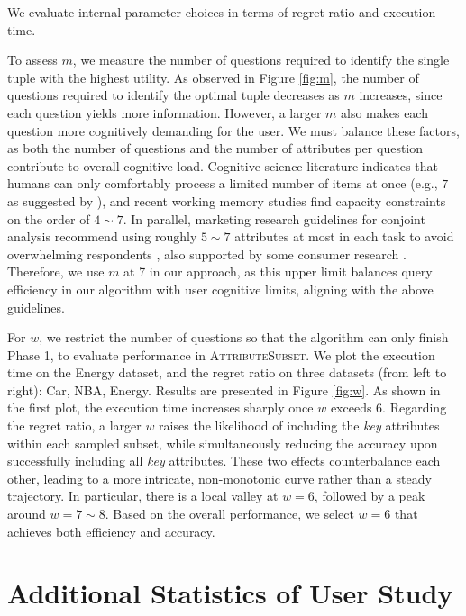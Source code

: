 \documentclass[conference]{IEEEtran}
\theoremstyle{definition}
\theoremstyle{plain}
\begin{document}
We evaluate internal parameter choices in terms of regret ratio and execution time.

To assess $m$, we measure the number of questions required to identify the single tuple with the highest utility. As observed in Figure \ref{fig:m}, the number of questions required to identify the optimal tuple decreases as $m$ increases, since each question yields more information. However, a larger $m$ also makes each question more cognitively demanding for the user. We must balance these factors, as both the number of questions and the number of attributes per question contribute to overall cognitive load. Cognitive science literature indicates that humans can only comfortably process a limited number of items at once (e.g., $7$ as suggested by \cite{MG56}), and recent working memory studies find capacity constraints on the order of $4\sim 7$\cite{Morra2024}. In parallel, marketing research guidelines for conjoint analysis recommend using roughly $5\sim7$ attributes at most in each task to avoid overwhelming respondents \cite{McCullough2007}, also supported by some consumer research \cite{OA14, GS78}. Therefore, we use $m$ at 7 in our approach, as this upper limit balances query efficiency in our algorithm with user cognitive limits, aligning with the above guidelines.

For $w$, we restrict the number of questions so that the algorithm can only finish Phase 1, to evaluate performance in \textsc{AttributeSubset}. We plot the execution time on the Energy dataset, and the regret ratio on three datasets (from left to right): Car, NBA, Energy. Results are presented in Figure \ref{fig:w}. As shown in the first plot, the execution time increases sharply once $w$ exceeds $6$. Regarding the regret ratio, a larger $w$ raises the likelihood of including the \textit{key} attributes within each sampled subset, while simultaneously reducing the accuracy upon successfully including all \textit{key} attributes. These two effects counterbalance each other, leading to a more intricate, non-monotonic curve rather than a steady trajectory. In particular, there is a local valley at $w=6$, followed by a peak around $w=7\sim 8$. Based on the overall performance, we select $w=6$ that achieves both efficiency and accuracy.

\section{Additional Statistics of User Study}
\label{appen:user_study}
\end{document}
